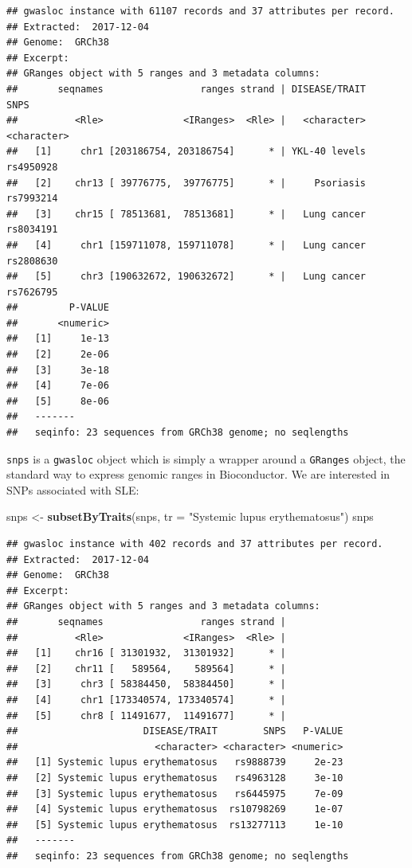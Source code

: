 \documentclass[9pt,a4paper,]{extarticle}
\newenvironment{Shaded}{\begin{snugshade}}{\end{snugshade}}
\newcommand{\KeywordTok}[1]{\textcolor[rgb]{0.13,0.29,0.53}{\textbf{#1}}}
\newcommand{\DataTypeTok}[1]{\textcolor[rgb]{0.13,0.29,0.53}{#1}}
\newcommand{\StringTok}[1]{\textcolor[rgb]{0.31,0.60,0.02}{#1}}
\newcommand{\NormalTok}[1]{#1}
\begin{document}
\begin{verbatim}
## gwasloc instance with 61107 records and 37 attributes per record.
## Extracted:  2017-12-04 
## Genome:  GRCh38 
## Excerpt:
## GRanges object with 5 ranges and 3 metadata columns:
##       seqnames                 ranges strand | DISEASE/TRAIT        SNPS
##          <Rle>              <IRanges>  <Rle> |   <character> <character>
##   [1]     chr1 [203186754, 203186754]      * | YKL-40 levels   rs4950928
##   [2]    chr13 [ 39776775,  39776775]      * |     Psoriasis   rs7993214
##   [3]    chr15 [ 78513681,  78513681]      * |   Lung cancer   rs8034191
##   [4]     chr1 [159711078, 159711078]      * |   Lung cancer   rs2808630
##   [5]     chr3 [190632672, 190632672]      * |   Lung cancer   rs7626795
##         P-VALUE
##       <numeric>
##   [1]     1e-13
##   [2]     2e-06
##   [3]     3e-18
##   [4]     7e-06
##   [5]     8e-06
##   -------
##   seqinfo: 23 sequences from GRCh38 genome; no seqlengths
\end{verbatim}

\texttt{snps} is a \texttt{gwasloc} object which is simply a wrapper around a \texttt{GRanges} object, the standard way to express genomic ranges in Bioconductor.
We are interested in SNPs associated with SLE:

\begin{Shaded}
\begin{Highlighting}[]
\NormalTok{snps <-}\StringTok{ }\KeywordTok{subsetByTraits}\NormalTok{(snps, }\DataTypeTok{tr =} \StringTok{"Systemic lupus erythematosus"}\NormalTok{)}
\NormalTok{snps}
\end{Highlighting}
\end{Shaded}

\begin{verbatim}
## gwasloc instance with 402 records and 37 attributes per record.
## Extracted:  2017-12-04 
## Genome:  GRCh38 
## Excerpt:
## GRanges object with 5 ranges and 3 metadata columns:
##       seqnames                 ranges strand |
##          <Rle>              <IRanges>  <Rle> |
##   [1]    chr16 [ 31301932,  31301932]      * |
##   [2]    chr11 [   589564,    589564]      * |
##   [3]     chr3 [ 58384450,  58384450]      * |
##   [4]     chr1 [173340574, 173340574]      * |
##   [5]     chr8 [ 11491677,  11491677]      * |
##                      DISEASE/TRAIT        SNPS   P-VALUE
##                        <character> <character> <numeric>
##   [1] Systemic lupus erythematosus   rs9888739     2e-23
##   [2] Systemic lupus erythematosus   rs4963128     3e-10
##   [3] Systemic lupus erythematosus   rs6445975     7e-09
##   [4] Systemic lupus erythematosus  rs10798269     1e-07
##   [5] Systemic lupus erythematosus  rs13277113     1e-10
##   -------
##   seqinfo: 23 sequences from GRCh38 genome; no seqlengths
\end{verbatim}
\end{document}
